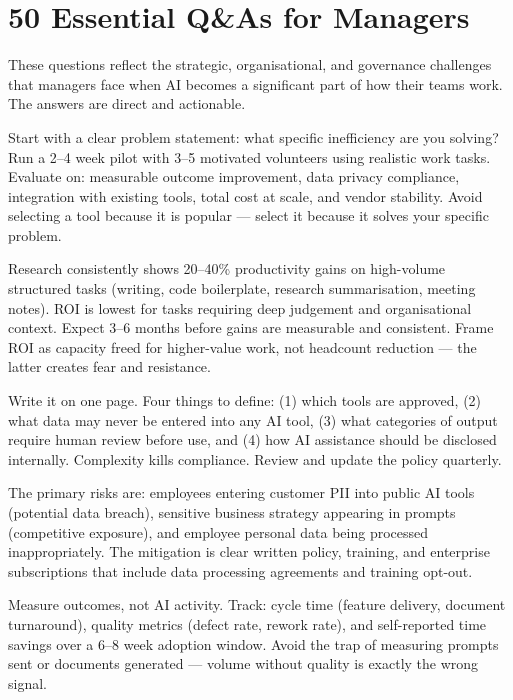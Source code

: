 \chapter{50 Essential Q\&As for Managers}
\label{ch:manager-qa}

These questions reflect the strategic, organisational, and governance challenges
that managers face when AI becomes a significant part of how their teams work.
The answers are direct and actionable.

{Start with a clear problem statement: what specific inefficiency are you solving?
Run a 2--4 week pilot with 3--5 motivated volunteers using realistic work tasks.
Evaluate on: measurable outcome improvement, data privacy compliance, integration with
existing tools, total cost at scale, and vendor stability.
Avoid selecting a tool because it is popular --- select it because it solves your
specific problem.}

{Research consistently shows 20--40\% productivity gains on high-volume structured tasks
(writing, code boilerplate, research summarisation, meeting notes).
ROI is lowest for tasks requiring deep judgement and organisational context.
Expect 3--6 months before gains are measurable and consistent.
Frame ROI as capacity freed for higher-value work, not headcount reduction --- the
latter creates fear and resistance.}

{Write it on one page.
Four things to define: (1) which tools are approved, (2) what data may never be
entered into any AI tool, (3) what categories of output require human review before
use, and (4) how AI assistance should be disclosed internally.
Complexity kills compliance.
Review and update the policy quarterly.}

{The primary risks are: employees entering customer PII into public AI tools (potential
data breach), sensitive business strategy appearing in prompts (competitive exposure),
and employee personal data being processed inappropriately.
The mitigation is clear written policy, training, and enterprise subscriptions that
include data processing agreements and training opt-out.}

{Measure outcomes, not AI activity.
Track: cycle time (feature delivery, document turnaround), quality metrics (defect rate,
rework rate), and self-reported time savings over a 6--8 week adoption window.
Avoid the trap of measuring prompts sent or documents generated ---
volume without quality is exactly the wrong signal.}

